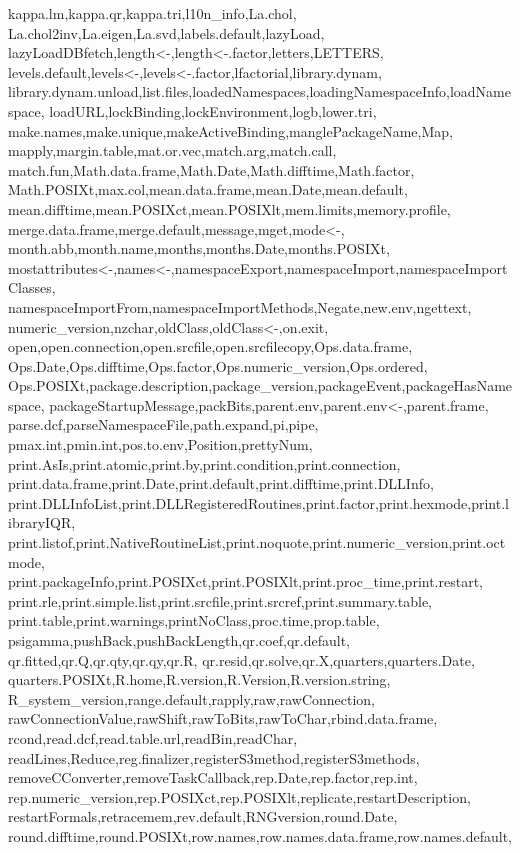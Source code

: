 {{kappa.lm,kappa.qr,kappa.tri,l10n_info,La.chol,%
La.chol2inv,La.eigen,La.svd,labels.default,lazyLoad,%
lazyLoadDBfetch,length<-,length<-.factor,letters,LETTERS,%
levels.default,levels<-,levels<-.factor,lfactorial,library.dynam,%
library.dynam.unload,list.files,loadedNamespaces,loadingNamespaceInfo,loadNamespace,%
loadURL,lockBinding,lockEnvironment,logb,lower.tri,%
make.names,make.unique,makeActiveBinding,manglePackageName,Map,%
mapply,margin.table,mat.or.vec,match.arg,match.call,%
match.fun,Math.data.frame,Math.Date,Math.difftime,Math.factor,%
Math.POSIXt,max.col,mean.data.frame,mean.Date,mean.default,%
mean.difftime,mean.POSIXct,mean.POSIXlt,mem.limits,memory.profile,%
merge.data.frame,merge.default,message,mget,mode<-,%
month.abb,month.name,months,months.Date,months.POSIXt,%
mostattributes<-,names<-,namespaceExport,namespaceImport,namespaceImportClasses,%
namespaceImportFrom,namespaceImportMethods,Negate,new.env,ngettext,%
numeric_version,nzchar,oldClass,oldClass<-,on.exit,%
open,open.connection,open.srcfile,open.srcfilecopy,Ops.data.frame,%
Ops.Date,Ops.difftime,Ops.factor,Ops.numeric_version,Ops.ordered,%
Ops.POSIXt,package.description,package_version,packageEvent,packageHasNamespace,%
packageStartupMessage,packBits,parent.env,parent.env<-,parent.frame,%
parse.dcf,parseNamespaceFile,path.expand,pi,pipe,%
pmax.int,pmin.int,pos.to.env,Position,prettyNum,%
print.AsIs,print.atomic,print.by,print.condition,print.connection,%
print.data.frame,print.Date,print.default,print.difftime,print.DLLInfo,%
print.DLLInfoList,print.DLLRegisteredRoutines,print.factor,print.hexmode,print.libraryIQR,%
print.listof,print.NativeRoutineList,print.noquote,print.numeric_version,print.octmode,%
print.packageInfo,print.POSIXct,print.POSIXlt,print.proc_time,print.restart,%
print.rle,print.simple.list,print.srcfile,print.srcref,print.summary.table,%
print.table,print.warnings,printNoClass,proc.time,prop.table,%
psigamma,pushBack,pushBackLength,qr.coef,qr.default,%
qr.fitted,qr.Q,qr.qty,qr.qy,qr.R,%
qr.resid,qr.solve,qr.X,quarters,quarters.Date,%
quarters.POSIXt,R.home,R.version,R.Version,R.version.string,%
R_system_version,range.default,rapply,raw,rawConnection,%
rawConnectionValue,rawShift,rawToBits,rawToChar,rbind.data.frame,%
rcond,read.dcf,read.table.url,readBin,readChar,%
readLines,Reduce,reg.finalizer,registerS3method,registerS3methods,%
removeCConverter,removeTaskCallback,rep.Date,rep.factor,rep.int,%
rep.numeric_version,rep.POSIXct,rep.POSIXlt,replicate,restartDescription,%
restartFormals,retracemem,rev.default,RNGversion,round.Date,%
round.difftime,round.POSIXt,row.names,row.names.data.frame,row.names.default,%
}}
